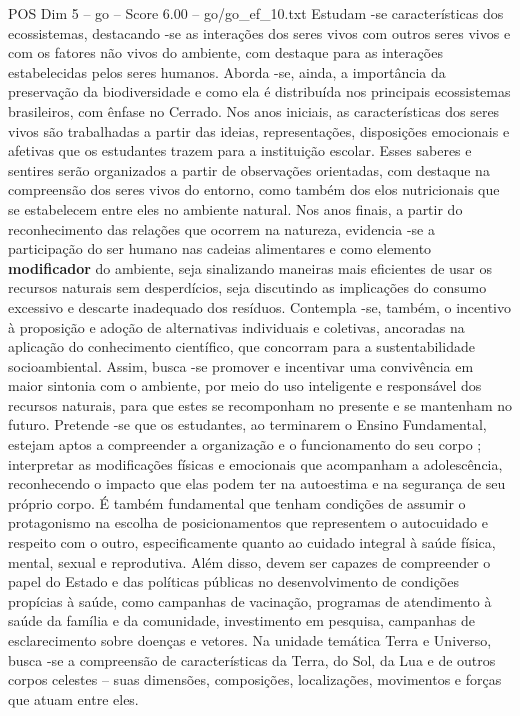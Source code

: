\begin{textsample}{POS Dim 5 – go – Score 6.00 – go/go\_ef\_10.txt}
Estudam -se características dos ecossistemas, destacando -se as interações dos seres vivos com outros seres vivos e com os fatores não vivos do ambiente, com destaque para as interações estabelecidas pelos seres humanos.
Aborda -se, ainda, a importância da preservação da biodiversidade e como ela é distribuída nos principais ecossistemas brasileiros, com ênfase no Cerrado.
Nos anos iniciais, as características dos seres vivos são trabalhadas a partir das ideias, representações, disposições emocionais e afetivas que os estudantes trazem para a instituição escolar.
Esses saberes e sentires serão organizados a partir de observações orientadas, com destaque na compreensão dos seres vivos do entorno, como também dos elos nutricionais que se estabelecem entre eles no ambiente natural.
Nos anos finais, a partir do reconhecimento das relações que ocorrem na natureza, evidencia -se a participação do ser humano nas cadeias alimentares e como elemento \textbf{modificador} do ambiente, seja sinalizando maneiras mais eficientes de usar os recursos naturais sem desperdícios, seja discutindo as implicações do consumo excessivo e descarte inadequado dos resíduos.
Contempla -se, também, o incentivo à proposição e adoção de alternativas individuais e coletivas, ancoradas na aplicação do conhecimento científico, que concorram para a sustentabilidade socioambiental.
Assim, busca -se promover e incentivar uma convivência em maior sintonia com o ambiente, por meio do uso inteligente e responsável dos recursos naturais, para que estes se recomponham no presente e se mantenham no futuro.
Pretende -se que os estudantes, ao terminarem o Ensino Fundamental, estejam aptos a compreender a organização e o funcionamento do seu corpo ; interpretar as modificações físicas e emocionais que acompanham a adolescência, reconhecendo o impacto que elas podem ter na autoestima e na segurança de seu próprio corpo.
É também fundamental que tenham condições de assumir o protagonismo na escolha de posicionamentos que representem o autocuidado e respeito com o outro, especificamente quanto ao cuidado integral à saúde física, mental, sexual e reprodutiva.
Além disso, devem ser capazes de compreender o papel do Estado e das políticas públicas no desenvolvimento de condições propícias à saúde, como campanhas de vacinação, programas de atendimento à saúde da família e da comunidade, investimento em pesquisa, campanhas de esclarecimento sobre doenças e vetores.
Na unidade temática Terra e Universo, busca -se a compreensão de características da Terra, do Sol, da Lua e de outros corpos celestes – suas dimensões, composições, localizações, movimentos e forças que atuam entre eles.

\end{textsample}

